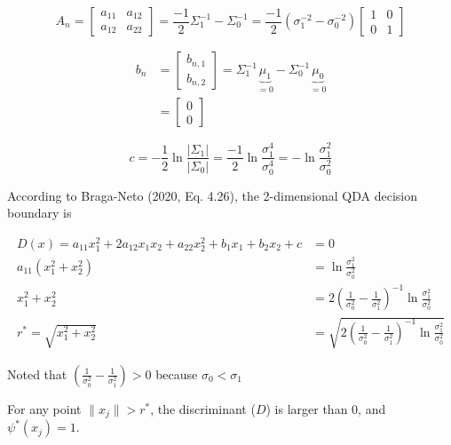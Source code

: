 \documentclass[
  letterpaper,
  DIV=11,
  numbers=noendperiod]{scrartcl}
\begin{document}
\begin{equation}
    A_n = \begin{bmatrix}
        a_{11} & a_{12}\\ 
        a_{12} & a_{22}
    \end{bmatrix} = \frac{-1}{2} \Sigma_{1}^{-1} - \Sigma_{0}^{-1} = \frac{-1}{2}(\sigma_{1}^{-2} - \sigma_{0}^{-2}) \begin{bmatrix}
        1 & 0\\ 
        0 & 1
    \end{bmatrix}
\end{equation}

\begin{align}
    b_n &= \begin{bmatrix}
        b_{n,1}\\ 
        b_{n,2}
    \end{bmatrix}
    = \Sigma_{1}^{-1}\underbrace{\mu_1}_{=0} - \Sigma_{0}^{-1}\underbrace{\mu_{0}}_{=0}\\
        &= \begin{bmatrix}
            0\\ 
            0
        \end{bmatrix}
\end{align}

\[c = -\frac{1}{2}\ln\frac{|\Sigma_1|}{|\Sigma_0|} = \frac{-1}{2}\ln\frac{\sigma_{1}^{4}}{\sigma_{0}^{4}} = -\ln \frac{\sigma_{1}^2}{\sigma_{0}^2}\]

According to Braga-Neto (2020, Eq. 4.26), the 2-dimensional QDA decision
boundary is

\begin{align}
    D(x) = a_{11}x^{2}_1 + 2 a_{12}x_1x_2 + a_{22}x^{2}_{2} + b_1 x_1 + b_2 x_2 + c &= 0\\
    a_{11}(x_{1}^{2} + x_{2}^{2}) &= \ln \frac{\sigma_{1}^2}{\sigma_{0}^2}\\
    x^{2}_{1} + x^{2}_{2} &= 2(\frac{1}{\sigma^{2}_{0}} - \frac{1}{\sigma^{2}_{1}})^{-1}\ln\frac{\sigma_{1}^2}{\sigma_{0}^2}\\
    r^{*} = \sqrt{x^{2}_{1} + x^{2}_{2}} &= \sqrt{2(\frac{1}{\sigma^{2}_{0}} - \frac{1}{\sigma^{2}_{1}})^{-1}\ln\frac{\sigma_{1}^2}{\sigma_{0}^2}}
\end{align}

Noted that
\(\left(\frac{1}{\sigma^{2}_{0}} - \frac{1}{\sigma^{2}_{1}}\right) > 0\)
because \(\sigma_0 < \sigma_1\)

For any point \(\|x_j\| > r^{*}\), the discriminant (\(D\)) is larger
than \(0\), and \(\psi^{*}(x_j) = 1\).
\end{document}
